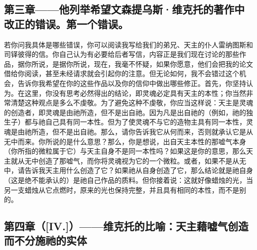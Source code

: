 
\subsection{第三章——他列举希望文森提乌斯·维克托的著作中改正的错误。第一个错误。}

若你问我具体是哪些错误，你可以阅读我写给我们的弟兄、天主的仆人雷纳图斯和司铎彼得的信。你自己认为有必要给后者写信，内容正是我们现在讨论的那些作品，据你所说，是据你所说，现在，我毫不怀疑，如果你愿意，他们会把我的论文借给你阅读，甚至未经请求就会引起你的注意。但无论如何，我不会错过这个机会，告诉你我希望在你的这些作品以及你的信仰中做出哪些修正。首先，你坚持认为。在这里，你没有思考必然得出的结论，即灵魂必定具有天主的本性；你当然非常清楚这种观点是多么不虔敬。为了避免这种不虔敬，你应当这样说：天主是灵魂的创造者，即灵魂是由祂所造，但不是出自祂。因为凡是出自祂的（例如，祂的独生子）都与祂自己具有同一本性。但为了使灵魂不与它的造物主具有同一本性，灵魂是由祂所造，但不是出自祂。那么，请你告诉我它从何而来，否则就承认它是从无中而来。你所说的是什么意思？那么，你是想说，出自天主本性的那嘘气本身（你所指的微粒属于它）与天主自身不是同一本性吗？如果这是你的意思，那么天主就从无中创造了那嘘气，而你将灵魂视为它的一个微粒。或者，如果不是从无中，请告诉我天主用什么创造了它？如果祂从自身创造了它，那么结论就是祂自身（这是绝不能承认的）是祂自己作品的质料。但你接着说：这就好像蜡烛的光，当另一支蜡烛从它点燃时，原来的光也保持完整，并且具有相同的本性，而不是别的。\par


\subsection{第四章（[IV.]）——维克托的比喻：天主藉嘘气创造而不分施祂的实体}

